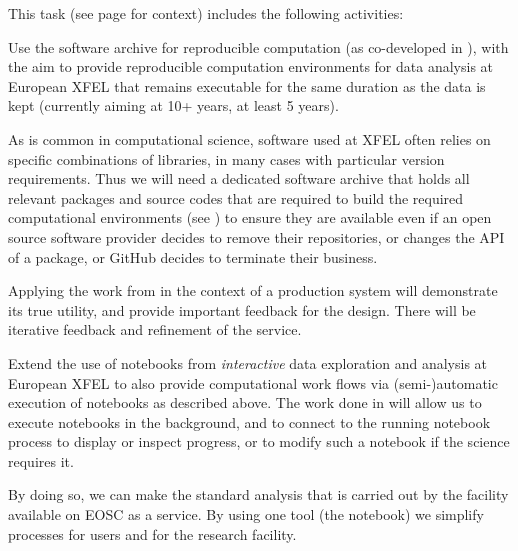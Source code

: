 \begin{task}[
  title=Demonstrator: Reproducible photon science workflows at European XFEL,
  id=reproducibility-xfel,
  lead=XFEL,
  PM=35,
  wphases={6-48},
  partners={EGI,INSERM,SRL,UPSUD}
  ]

  This task (see page \pageref{sec:concept-demonstrator-photonscience}
  for context) includes the following activities:
  \begin{compactitem}
  \item Use the software archive for reproducible computation
    (as co-developed in ), with
    the aim to provide reproducible computation environments for data analysis at
    European XFEL that remains executable for the same duration as the
    data is kept (currently aiming at 10+ years, at least 5 years).

    As is common in computational science, software used at XFEL often
    relies on specific combinations of libraries, in many cases with
    particular version requirements. Thus we will need a dedicated
    software archive that holds all relevant packages and source codes
    that are required to build the required computational environments
    (see ) to ensure they are
    available even if an open source software provider decides to
    remove their repositories, or changes the API of a package, or
    GitHub decides to terminate their business.

    Applying the work from  in the
    context of a production system will demonstrate its true utility,
    and provide important feedback for the design. There will be
    iterative feedback and refinement of the service.

  \item Extend the use of notebooks from \emph{interactive} data
    exploration and analysis at European XFEL to also provide
    computational work flows via (semi-)automatic execution of
    notebooks as described above. The work done in
     will allow us to execute notebooks in
    the background, and to connect to the running notebook process to
    display or inspect progress, or to modify such a notebook if the
    science requires it.

    By doing so, we can make the standard analysis that is carried out
    by the facility available on EOSC as a service. By using one tool
    (the notebook) we simplify processes for users and for the research
    facility.


\end{compactitem}
\end{task}
